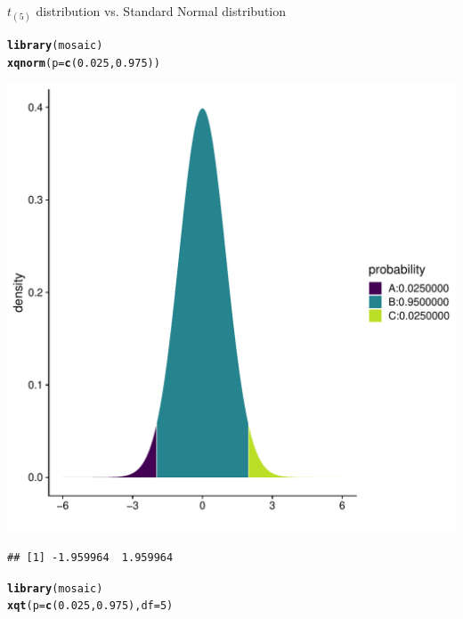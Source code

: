 \documentclass[10pt]{beamer}\usepackage[]{graphicx}\usepackage[]{color}
\makeatletter
\def\maxwidth{ %
  \ifdim\Gin@nat@width>\linewidth
    \linewidth
  \else
    \Gin@nat@width
  \fi
}
\newcommand{\hlnum}[1]{\textcolor[rgb]{0.686,0.059,0.569}{#1}}%
\newcommand{\hlstd}[1]{\textcolor[rgb]{0.345,0.345,0.345}{#1}}%
\newcommand{\hlkwc}[1]{\textcolor[rgb]{0.333,0.667,0.333}{#1}}%
\newcommand{\hlkwd}[1]{\textcolor[rgb]{0.737,0.353,0.396}{\textbf{#1}}}%
\newenvironment{kframe}{%
 \def\at@end@of@kframe{}%
 \ifinner\ifhmode%
  \def\at@end@of@kframe{\end{minipage}}%
  \begin{minipage}{\columnwidth}%
 \fi\fi%
 \def\FrameCommand##1{\hskip\@totalleftmargin \hskip-\fboxsep
 \colorbox{shadecolor}{##1}\hskip-\fboxsep
     \hskip-\linewidth \hskip-\@totalleftmargin \hskip\columnwidth}%
 \MakeFramed {\advance\hsize-\width
   \@totalleftmargin\z@ \linewidth\hsize
   \@setminipage}}%
 {\par\unskip\endMakeFramed%
 \at@end@of@kframe}
\newenvironment{knitrout}{}{} %
\makeatother
\begin{document}
\begin{frame}[fragile]{$t_{(5)}$ distribution vs. Standard Normal distribution}
	\begin{minipage}{0.47\textwidth}
\begin{knitrout}\tiny
{}\color{fgcolor}\begin{kframe}
\begin{alltt}
\hlkwd{library}\hlstd{(mosaic)}
\hlkwd{xqnorm}\hlstd{(}\hlkwc{p} \hlstd{=} \hlkwd{c}\hlstd{(}\hlnum{0.025}\hlstd{,} \hlnum{0.975}\hlstd{))}
\end{alltt}
\end{kframe}
\end{knitrout}
\begin{knitrout}\tiny
{}\color{fgcolor}

{\centering \includegraphics[width=\maxwidth]{figure/unnamed-chunk-3-1} 

}


\begin{kframe}\begin{verbatim}
## [1] -1.959964  1.959964
\end{verbatim}
\end{kframe}
\end{knitrout}
	\end{minipage}
	\begin{minipage}{0.5\textwidth}
\begin{knitrout}\tiny
{}\color{fgcolor}\begin{kframe}
\begin{alltt}
\hlkwd{library}\hlstd{(mosaic)}
\hlkwd{xqt}\hlstd{(}\hlkwc{p} \hlstd{=} \hlkwd{c}\hlstd{(}\hlnum{0.025}\hlstd{,} \hlnum{0.975}\hlstd{),} \hlkwc{df} \hlstd{=} \hlnum{5}\hlstd{)}
\end{alltt}
\end{kframe}


\end{knitrout}
\end{minipage}
\end{frame}
\end{document}
